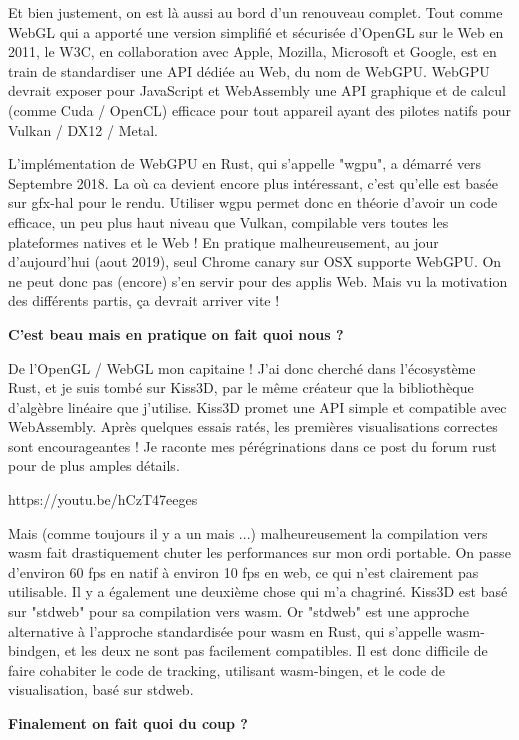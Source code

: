 Et bien justement, on est là aussi au bord d’un renouveau complet. Tout comme WebGL qui a apporté une version simplifié et sécurisée d'OpenGL sur le Web en 2011, le W3C, en collaboration avec Apple, Mozilla, Microsoft et Google, est en train de standardiser une API dédiée au Web, du nom de WebGPU. WebGPU devrait exposer pour JavaScript et WebAssembly une API graphique et de calcul (comme Cuda / OpenCL) efficace pour tout appareil ayant des pilotes natifs pour Vulkan / DX12 / Metal.

L'implémentation de WebGPU en Rust, qui s'appelle "wgpu", a démarré vers Septembre 2018. La où ca devient encore plus intéressant, c'est qu'elle est basée sur gfx-hal pour le rendu. Utiliser wgpu permet donc en théorie d'avoir un code efficace, un peu plus haut niveau que Vulkan, compilable vers toutes les plateformes natives et le Web ! En pratique malheureusement, au jour d'aujourd'hui (aout 2019), seul Chrome canary sur OSX supporte WebGPU. On ne peut donc pas (encore) s'en servir pour des applis Web. Mais vu la motivation des différents partis, ça devrait arriver vite !

\textbf{C’est beau mais en pratique on fait quoi nous ?}

De l'OpenGL / WebGL mon capitaine ! J'ai donc cherché dans l'écosystème Rust, et je suis tombé sur Kiss3D, par le même créateur que la bibliothèque d'algèbre linéaire que j'utilise. Kiss3D promet une API simple et compatible avec WebAssembly. Après quelques essais ratés, les premières visualisations correctes sont encourageantes ! Je raconte mes pérégrinations dans ce post du forum rust pour de plus amples détails.


https://youtu.be/hCzT47eeges


Mais (comme toujours il y a un mais ...) malheureusement la compilation vers wasm fait drastiquement chuter les performances sur mon ordi portable. On passe d'environ 60 fps en natif à environ 10 fps en web, ce qui n'est clairement pas utilisable. Il y a également une deuxième chose qui m'a chagriné. Kiss3D est basé sur "stdweb" pour sa compilation vers wasm. Or "stdweb" est une approche alternative à l'approche standardisée pour wasm en Rust, qui s'appelle wasm-bindgen, et les deux ne sont pas facilement compatibles. Il est donc difficile de faire cohabiter le code de tracking, utilisant wasm-bingen, et le code de visualisation, basé sur stdweb.

\textbf{Finalement on fait quoi du coup ?}

